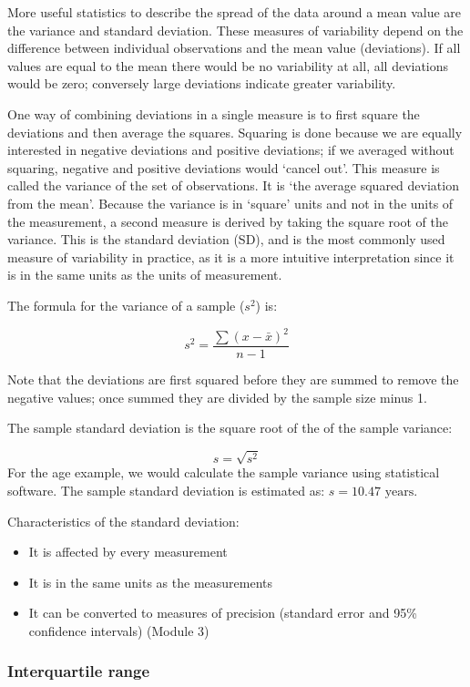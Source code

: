\documentclass[
  a4paper,
]{memoir}
\providecommand{\tightlist}{%
  \setlength{\itemsep}{0pt}\setlength{\parskip}{0pt}}\usepackage{longtable,booktabs,array}
\begin{document}
More useful statistics to describe the spread of the data around a mean
value are the variance and standard deviation. These measures of
variability depend on the difference between individual observations and
the mean value (deviations). If all values are equal to the mean there
would be no variability at all, all deviations would be zero; conversely
large deviations indicate greater variability.

One way of combining deviations in a single measure is to first square
the deviations and then average the squares. Squaring is done because we
are equally interested in negative deviations and positive deviations;
if we averaged without squaring, negative and positive deviations would
`cancel out'. This measure is called the variance of the set of
observations. It is `the average squared deviation from the mean'.
Because the variance is in `square' units and not in the units of the
measurement, a second measure is derived by taking the square root of
the variance. This is the standard deviation (SD), and is the most
commonly used measure of variability in practice, as it is a more
intuitive interpretation since it is in the same units as the units of
measurement.

The formula for the variance of a sample (\(s^2\)) is:

\[ s^2 = \frac{\sum(x - \bar{x})^2}{n-1} \]

Note that the deviations are first squared before they are summed to
remove the negative values; once summed they are divided by the sample
size minus 1.

The sample standard deviation is the square root of the of the sample
variance:

\[s = \sqrt{s^2}\] For the age example, we would calculate the sample
variance using statistical software. The sample standard deviation is
estimated as: \(s = 10.47 \text{ years}\).

Characteristics of the standard deviation:

\begin{itemize}
\tightlist
\item
  It is affected by every measurement
\item
  It is in the same units as the measurements
\item
  It can be converted to measures of precision (standard error and 95\%
  confidence intervals) (Module 3)
\end{itemize}

\hypertarget{interquartile-range}{%
\subsubsection{Interquartile range}\label{interquartile-range}}
\end{document}
